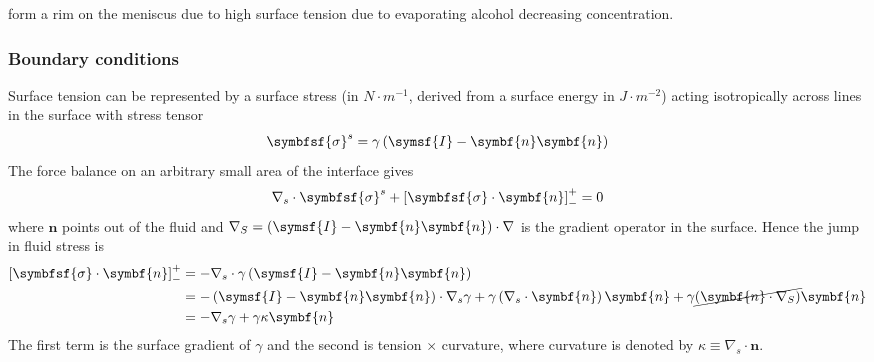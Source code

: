 \documentclass{jknotes}
\begin{document}
\begin{itemize}
		form a rim on the meniscus due to high surface tension due to
		evaporating alcohol decreasing concentration.
		\begin{center}
		\end{center}
\end{itemize}

\subsubsection{Boundary conditions}
Surface tension can be represented by a surface stress (in $N \cdot m^{-1}$,
derived from a surface energy in $J \cdot m^{-2}$) acting isotropically across
lines in the surface with stress tensor
\begin{equation}
	\symbfsf{\sigma}^s = \gamma \left( \symsf{I} - \symbf{n}\symbf{n}\right)
\end{equation}
The force balance on an arbitrary small area of the interface gives
\begin{equation}
	\nabla_s \cdot \symbfsf{\sigma}^s + \left[ \symbfsf{\sigma} \cdot
	\symbf{n}\right]^+_- = 0
\end{equation}
where $\symbf{n}$ points out of the fluid and $\nabla_S = \left(\symsf{I} -
\symbf{n}\symbf{n}\right) \cdot \nabla$ is the gradient operator in the surface.
Hence the jump in fluid stress is
\begin{align}
	\left[ \symbfsf{\sigma} \cdot \symbf{n}\right]^+_- &= -\nabla_s \cdot
	\gamma \left( \symsf{I} - \symbf{n}\symbf{n}\right)\\
		&= -\left( \symsf{I} - \symbf{n}\symbf{n}\right) \cdot \nabla_s \gamma + \gamma
	\left( \nabla_s \cdot \symbf{n}\right)\symbf{n} + \gamma \cancel{(\symbf{n}\cdot
	\nabla_S)} \symbf{n}\\
	&= -\nabla_s \gamma + \gamma \kappa \symbf{n}
\end{align}
The first term is the surface gradient of $\gamma$ and the second is tension
$\times$ curvature, where curvature is denoted by $\kappa \equiv \nabla_s
\cdot \symbf{n}$.
\end{document}
